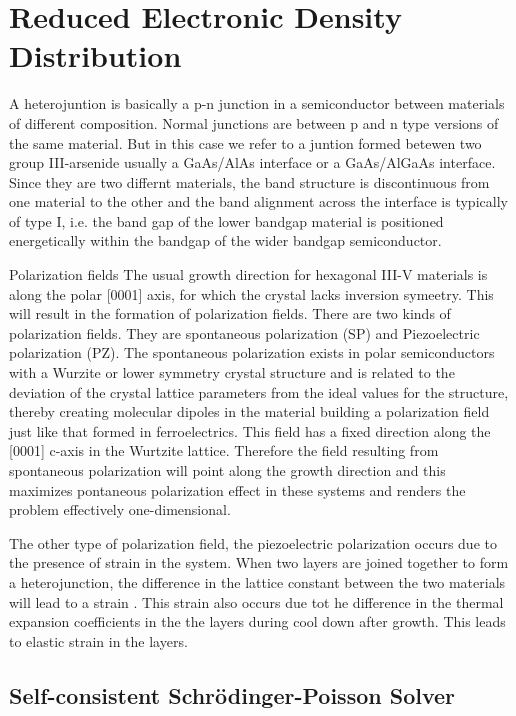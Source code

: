 \chapter{Reduced Electronic Density Distribution} \label{ED}

A heterojuntion is basically a p-n junction in a semiconductor between
materials of different composition. Normal junctions are between p and n type
versions of the same material. But in this case we refer to a juntion formed
betewen two group III-arsenide usually a GaAs/AlAs interface or a GaAs/AlGaAs
interface. Since they are two differnt materials, the band structure is
discontinuous from one material to the other and the band alignment across the
interface is typically of type I, i.e. the band gap of the lower bandgap
material is positioned energetically within the bandgap of the wider bandgap
semiconductor.

Polarization fields 
The usual growth direction for hexagonal III-V materials is
along the polar [0001] axis, for which the crystal lacks inversion symeetry.
This will result in the formation of polarization fields. There are two kinds
of polarization fields. They are spontaneous polarization (SP) and
Piezoelectric polarization (PZ).  The spontaneous polarization exists in polar
semiconductors with a Wurzite or lower symmetry crystal structure and is
related to the deviation of the crystal lattice parameters from the ideal
values for the structure, thereby creating molecular dipoles in the material
building a polarization field just like that formed in ferroelectrics. This
field has a fixed direction along the [0001] c-axis in the Wurtzite lattice.
Therefore the field resulting from spontaneous polarization will point along
the growth direction and this maximizes pontaneous polarization effect in these
systems and renders the problem effectively one-dimensional.

The other type of polarization field, the piezoelectric polarization occurs due
to the presence of strain in the system. When two layers are joined together to
form a heterojunction, the difference in the lattice constant between the two
materials will lead to a strain . This strain also occurs due tot he difference
in the thermal expansion coefficients in the the layers during cool down after
growth. This leads to elastic strain in the layers. 

\section{Self-consistent Schr{\"o}dinger-Poisson Solver} \label{sec:model}

